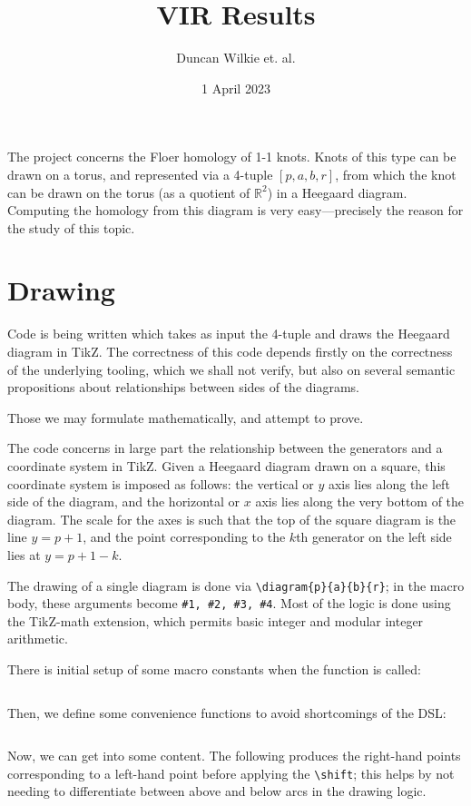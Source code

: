 \documentclass{article}
\title{VIR Results}
\author{Duncan Wilkie et. al.}
\date{1 April 2023}
\begin{document}
\maketitle

The project concerns the Floer homology of 1-1 knots.
Knots of this type can be drawn on a torus, and represented via a 4-tuple $[p, a, b, r]$,
from which the knot can be drawn on the torus (as a quotient of $\mathbb{R}^{2}$) in a Heegaard diagram.
Computing the homology from this diagram is very easy---precisely the reason for the study of this topic.

\section{Drawing}

Code is being written which takes as input the 4-tuple and draws the Heegaard diagram in TikZ.
The correctness of this code depends firstly on the correctness of the underlying tooling,
which we shall not verify,
but also on several semantic propositions about relationships between sides of the diagrams.

Those we may formulate mathematically, and attempt to prove.

The code concerns in large part the relationship between the generators and a coordinate system in TikZ.
Given a Heegaard diagram drawn on a square, this coordinate system is imposed as follows:
the vertical or $y$ axis lies along the left side of the diagram, and the horizontal or $x$ axis
lies along the very bottom of the diagram.
The scale for the axes is such that the top of the square diagram is the line $y = p+1$,
and the point corresponding to the $k$th generator on the left side lies at $y = p + 1 - k$.

The drawing of a single diagram is done via \verb|\diagram{p}{a}{b}{r}|; in the macro body, these arguments become \verb|#1, #2, #3, #4|.
Most of the logic is done using the TikZ-math extension, which permits basic integer and modular integer arithmetic.

There is initial setup of some macro constants when the function is called:
\inputminted[firstline=11, lastline=41]{tex}{../draw/draw.tex}

Then, we define some convenience functions to avoid shortcomings of the DSL:
\inputminted[firstline=42, lastline=61]{tex}{../draw/draw.tex}

Now, we can get into some content.
The following produces the right-hand points corresponding to a left-hand point before applying the \verb|\shift|;
this helps by not needing to differentiate between above and below arcs in the drawing logic.
\inputminted[firstline=62, lastline=74]{tex}{../draw/draw.tex}
\end{document}
